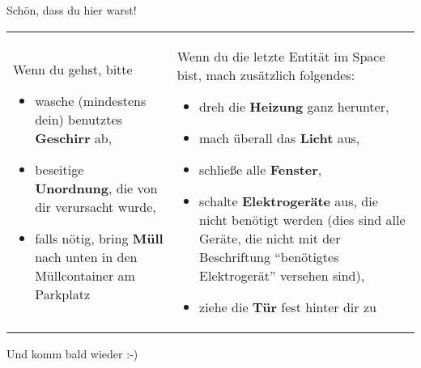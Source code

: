 \documentclass[a4paper,12pt]{article}
\renewcommand{\emph}[1]{\textbf{\huge #1}}
\begin{document}
\LARGE

{\hspace{\tabcolsep}\Huge Schön, dass du hier warst!}\\[1ex]

\begin{tabularx}{\textwidth}{XX}
  Wenn du gehst, bitte
  \begin{itemize}
    \item wasche (mindestens dein) benutztes \emph{Geschirr} ab,
    \item beseitige \emph{Unordnung}, die von dir verursacht wurde,
    \item falls nötig, bring \emph{Müll} nach unten in den Müllcontainer am
      Parkplatz
  \end{itemize}

  &

  Wenn du die letzte Entität im Space bist, mach zusätzlich folgendes:

  \begin{itemize}
    \item dreh die \emph{Heizung} ganz herunter,
    \item mach überall das \emph{Licht} aus,
    \item schließe alle \emph{Fenster},
    \item schalte \emph{Elektrogeräte} aus, die nicht benötigt werden
      {\large (dies sind alle Geräte, die nicht mit der
      Beschriftung "`benötigtes Elektrogerät"' versehen sind)},
    \item ziehe die \emph{Tür} fest hinter dir zu
  \end{itemize}
\end{tabularx}

\hspace{\tabcolsep} Und komm bald wieder :-)
\end{document}
